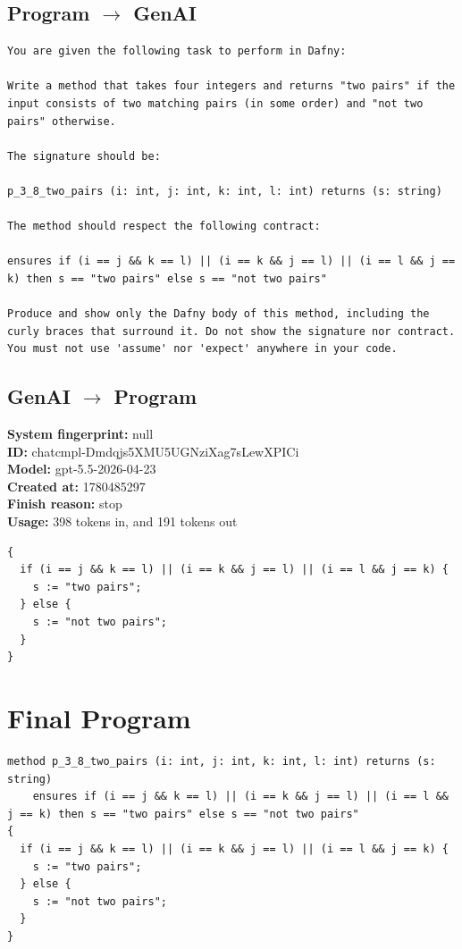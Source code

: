 \documentclass{article}
\begin{document}
\subsection*{Program $\rightarrow$ GenAI}
\begin{lstlisting}
You are given the following task to perform in Dafny:

Write a method that takes four integers and returns "two pairs" if the input consists of two matching pairs (in some order) and "not two pairs" otherwise.

The signature should be:

p_3_8_two_pairs (i: int, j: int, k: int, l: int) returns (s: string)

The method should respect the following contract:

ensures if (i == j && k == l) || (i == k && j == l) || (i == l && j == k) then s == "two pairs" else s == "not two pairs"

Produce and show only the Dafny body of this method, including the curly braces that surround it. Do not show the signature nor contract. You must not use 'assume' nor 'expect' anywhere in your code.
\end{lstlisting}
\subsection*{GenAI $\rightarrow$ Program}
\textbf{System fingerprint: }null
\\\textbf{ID: }chatcmpl-Dmdqjs5XMU5UGNziXag7sLewXPICi
\\\textbf{Model: }gpt-5.5-2026-04-23
\\\textbf{Created at: }1780485297
\\\textbf{Finish reason: }stop
\\\textbf{Usage: }398 tokens in, and 191 tokens out
\begin{lstlisting}
{
  if (i == j && k == l) || (i == k && j == l) || (i == l && j == k) {
    s := "two pairs";
  } else {
    s := "not two pairs";
  }
}
\end{lstlisting}
\section*{Final Program}
\begin{lstlisting}
method p_3_8_two_pairs (i: int, j: int, k: int, l: int) returns (s: string)
	ensures if (i == j && k == l) || (i == k && j == l) || (i == l && j == k) then s == "two pairs" else s == "not two pairs"
{
  if (i == j && k == l) || (i == k && j == l) || (i == l && j == k) {
    s := "two pairs";
  } else {
    s := "not two pairs";
  }
}
\end{lstlisting}
\end{document}
